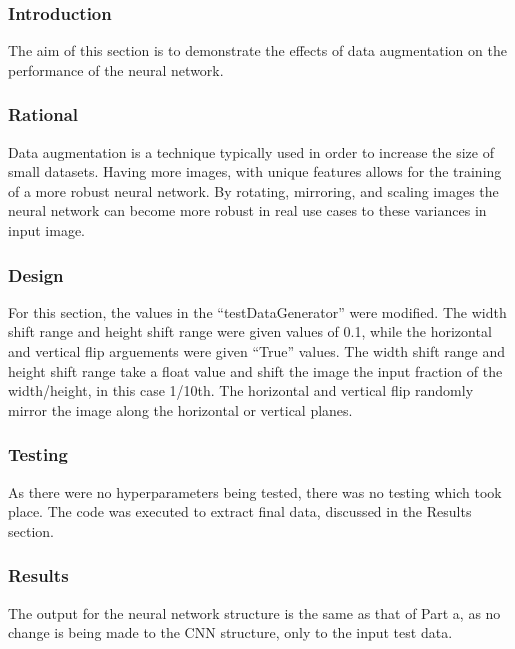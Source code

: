 \subsubsection{Introduction}

The aim of this section is to demonstrate the effects of data augmentation on
the performance of the neural network.

\subsubsection{Rational}

Data augmentation is a technique typically used in order to increase the size of
small datasets. Having more images, with unique features allows for the training
of a more robust neural network. By rotating, mirroring, and scaling images the
neural network can become more robust in real use cases to these variances in
input image.

\subsubsection{Design}

For this section, the values in the ``testDataGenerator'' were modified. The
width shift range and height shift range were given values of 0.1, while the
horizontal and vertical flip arguements were given ``True'' values. The width
shift range and height shift range take a float value and shift the image the
input fraction of the width/height, in this case 1/10th. The horizontal and
vertical flip randomly mirror the image along the horizontal or vertical planes.

\subsubsection{Testing}

As there were no hyperparameters being tested, there was no testing which took
place. The code was executed to extract final data, discussed in the Results
section.

\subsubsection{Results}

The output for the neural network structure is the same as that of Part a, as no
change is being made to the CNN structure, only to the input test data.

